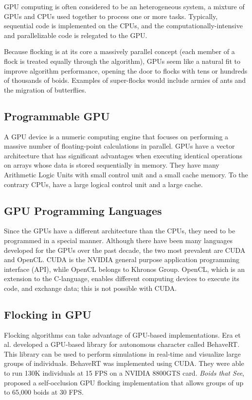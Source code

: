 GPU computing is often considered to be an heterogeneous system, a mixture of GPUs and CPUs used together to process one or more tasks. Typically, sequential code is implemented on the CPUs, and the computationally-intensive and parallelizable code is relegated to the GPU.

Because flocking is at its core a massively parallel concept (each member of a flock is treated equally through the algorithm), GPUs seem like a natural fit to improve algorithm performance, opening the door to flocks with tens or hundreds of thousands of boids. Examples of super-flocks would include armies of ants and the migration of butterflies. 


\subsection{Programmable GPU}
A GPU device is a numeric computing engine\cite{GPUbook} that focuses on performing a massive number of floating-point calculations in parallel. GPUs have a vector architecture that has significant advantages when executing identical operations on arrays whose data is stored sequentially in memory. They have many Arithmetic Logic Units with small control unit and a small cache memory. To the contrary CPUs, have a large logical control unit and a large cache. 

\subsection{GPU Programming Languages}
Since the GPUs have a different architecture than the CPUs, they need to be programmed in a special manner. Although there have been many languages developed for the GPUs over the past decade, the two most prevalent are CUDA and OpenCL. CUDA is the NVIDIA  general purpose application programming interface (API)\cite{CUDAandOpenCL}, while OpenCL belongs to Khronos Group\cite{opencl}. OpenCL, which is an extension to the C-language,  enables different computing devices to execute its code, and exchange data; this is not 
possible with CUDA.
 
\subsection{Flocking in GPU}\label{flockingGPU}
Flocking algorithms can take advantage of GPU-based implementations. Era et al. developed a GPU-based library for autonomous character called BehaveRT\cite{BehaveRT}. This library can be used to perform simulations in real-time and visualize large groups of individuals. BehaveRT was implemented using CUDA. They were able to run 130K individuals at 15 FPS on a NVIDIA 8800GTS card. \textit{Boids that See}, proposed a self-occlusion GPU flocking implementation that allows groups of up to 65,000 boids at 30 FPS\cite{boidsThatSee}. 

